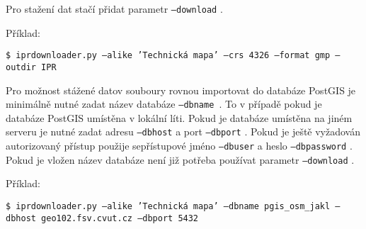 Pro stažení dat stačí přidat parametr {\tt --download} .

Příklad:

{\tt \$ iprdownloader.py ---alike 'Technická mapa' ---crs 4326 ---format gmp ---outdir IPR}

Pro možnost stážené datov souboury rovnou importovat do databáze PostGIS je 
minimálně nutné zadat název databáze {\tt ---dbname }. To v případě pokud je
databáze PostGIS umístěna v lokální líti. Pokud je databáze umístěna na jiném
serveru je nutné zadat adresu {\tt ---dbhost} a port {\tt ---dbport} . Pokud je
ještě vyžadován autorizovaný přístup použije sepřístupové jméno {\tt ---dbuser} a
heslo {\tt ---dbpassword} . 
Pokud je vložen název databáze není již potřeba používat parametr {\tt ---download} .

Příklad:

{\tt \$ iprdownloader.py ---alike 'Technická mapa' ---dbname pgis\_osm\_jakl ---dbhost geo102.fsv.cvut.cz  ---dbport 5432 } 
 

